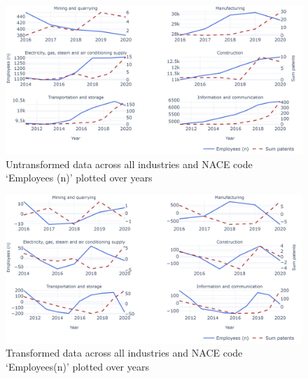 \documentclass[
  12pt,
  a4paperpaper,
]{article}
\begin{document}
\begin{figure}[H]

{\centering \includegraphics{rieg2023_files/figure-pdf/fig-untransformed-data-employees-output-1.jpeg}

}

\caption{\label{fig-untransformed-data-employees}Untransformed data
across all industries and NACE code `Employees (n)' plotted over years}

\end{figure}

\begin{figure}[H]

{\centering \includegraphics{rieg2023_files/figure-pdf/fig-transformed-data-employees-output-1.jpeg}

}

\caption{\label{fig-transformed-data-employees}Transformed data across
all industries and NACE code `Employees(n)' plotted over years}

\end{figure}
\end{document}
